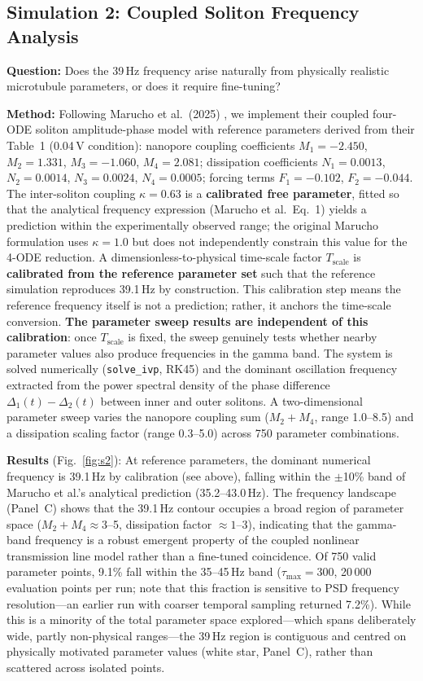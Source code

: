 \documentclass[10pt, a4paper, twocolumn]{article}
\begin{document}
\subsection{Simulation 2: Coupled Soliton Frequency Analysis}
\label{sec:sim2}

\textbf{Question:} Does the 39\,Hz frequency arise naturally from
physically realistic microtubule parameters, or does it require
fine-tuning?

\textbf{Method:} Following Marucho et al.\ (2025) \cite{marucho2025},
we implement their coupled four-ODE soliton amplitude-phase model with
reference parameters derived from their Table~1 (0.04\,V condition):
nanopore coupling coefficients $M_1 = -2.450$, $M_2 = 1.331$,
$M_3 = -1.060$, $M_4 = 2.081$; dissipation coefficients
$N_1 = 0.0013$, $N_2 = 0.0014$, $N_3 = 0.0024$, $N_4 = 0.0005$;
forcing terms $F_1 = -0.102$, $F_2 = -0.044$. The inter-soliton
coupling $\kappa = 0.63$ is a \textbf{calibrated free parameter},
fitted so that the analytical frequency expression (Marucho et al.\
Eq.~1) yields a prediction within the experimentally observed range;
the original Marucho formulation uses $\kappa = 1.0$ but does not
independently constrain this value for the 4-ODE reduction. A
dimensionless-to-physical time-scale factor $T_{\text{scale}}$ is
\textbf{calibrated from the reference parameter set} such that the
reference simulation reproduces 39.1\,Hz by construction. This
calibration step means the reference frequency itself is not a
prediction; rather, it anchors the time-scale conversion.
\textbf{The parameter sweep results are independent of this
calibration}: once $T_{\text{scale}}$ is fixed, the sweep
genuinely tests whether nearby parameter values also produce
frequencies in the gamma band. The system is solved numerically
(\texttt{solve\_ivp}, RK45) and the dominant oscillation frequency
extracted from the power spectral density of the phase difference
$\Delta_1(t) - \Delta_2(t)$ between inner and outer solitons. A
two-dimensional parameter sweep varies the nanopore coupling sum
($M_2 + M_4$, range 1.0--8.5) and a dissipation scaling factor
(range 0.3--5.0) across 750 parameter combinations.

\textbf{Results} (Fig.~\ref{fig:s2}): At reference parameters,
the dominant numerical frequency is 39.1\,Hz by calibration (see
above), falling within the $\pm$10\% band of Marucho et al.'s
analytical prediction (35.2--43.0\,Hz). The frequency landscape
(Panel~C) shows that the 39.1\,Hz contour occupies a broad region
of parameter space ($M_2 + M_4 \approx 3$--5, dissipation factor
$\approx 1$--3), indicating that the gamma-band frequency is a
robust emergent property of the coupled nonlinear transmission line
model rather than a fine-tuned coincidence. Of 750 valid parameter
points, 9.1\% fall within the 35--45\,Hz band
($\tau_{\max} = 300$, 20\,000 evaluation points per run;
note that this fraction is sensitive to PSD frequency
resolution---an earlier run with coarser temporal sampling
returned 7.2\%). While this is a
minority of the total parameter space explored---which spans
deliberately wide, partly non-physical ranges---the 39\,Hz region
is contiguous and centred on physically motivated parameter values
(white star, Panel~C), rather than scattered across isolated points.
\end{document}

